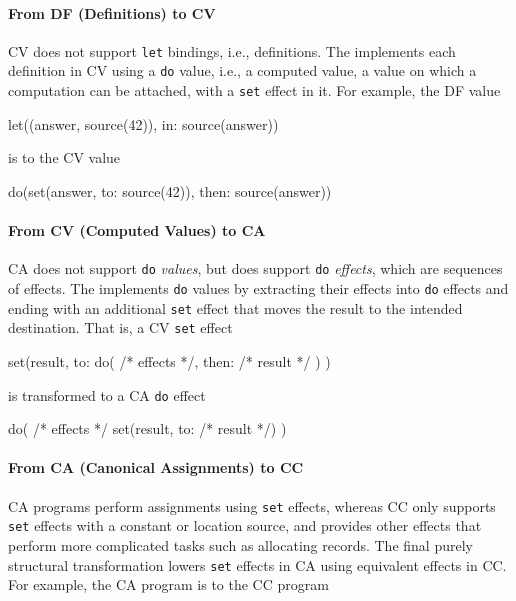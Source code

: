 \documentclass[main.tex]{subfiles}
\begin{document}
\paragraph{From DF (Definitions) to CV} CV does not support \texttt{let} bindings, i.e., definitions. The  implements each definition in CV using a \texttt{do} value, i.e., a computed value, a value on which a computation can be attached, with a \texttt{set} effect in it. For example, the DF value
\begin{il}
	let((answer, source(42)), in: source(answer))
\end{il}
is \lowered{} to the CV value
\begin{il}
	do(set(answer, to: source(42)), then: source(answer))
\end{il}

\paragraph{From CV (Computed Values) to CA} CA does not support \texttt{do} \emph{values}, but does support \texttt{do} \emph{effects}, which are sequences of effects. The  implements \texttt{do} values by extracting their effects into \texttt{do} effects and ending with an additional \texttt{set} effect that moves the result to the intended destination. That is, a CV \texttt{set} effect
\begin{il}
	set(result, to:
		do(
			/* effects */,
			then: /* result */
		)
	)
\end{il}
is transformed to a CA \texttt{do} effect
\begin{il}
	do(
		/* effects */
		set(result, to: /* result */)
	)
\end{il}

\paragraph{From CA (Canonical Assignments) to CC} CA programs perform assignments using \texttt{set} effects, whereas CC only supports \texttt{set} effects with a constant or location source, and provides other effects that perform more complicated tasks such as allocating records. The final purely structural transformation lowers \texttt{set} effects in CA using equivalent effects in CC. For example, the CA program
is \lowered{} to the CC program
\end{document}
